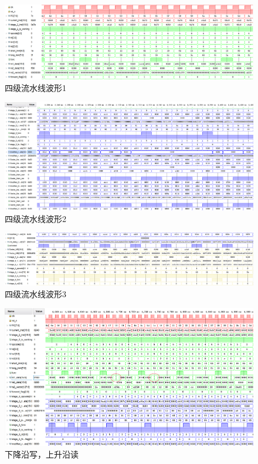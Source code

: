 \documentclass{article}
\begin{document}
\begin{figure}[!ht]
    \centering
    \includegraphics[width = \textwidth]{Pipline1_Sim.png}
    \caption{四级流水线波形1}
\end{figure}

\begin{figure}[!ht]
    \centering
    \includegraphics[width = \textwidth]{Pipline_Sim2.png}
    \caption{四级流水线波形2}
\end{figure}

\begin{figure}[!ht]
    \centering
    \includegraphics[width = \textwidth]{Pipline_Sim3.png}
    \caption{四级流水线波形3}
\end{figure}

\begin{figure}[!ht]
    \centering
    \includegraphics[width = \textwidth]{Forwarding_Sim.png}
    \caption{下降沿写，上升沿读}
\end{figure}
\end{document}
